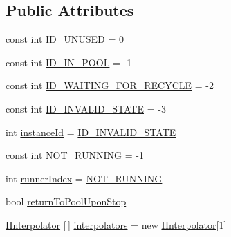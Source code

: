 \subsection*{Public Attributes}
\begin{DoxyCompactItemize}
\item 
const int \mbox{\hyperlink{class_leap_1_1_unity_1_1_animation_1_1_internal_1_1_tween_instance_adebc9c9f12e5bed3a16929995e0fe948}{I\+D\+\_\+\+U\+N\+U\+S\+ED}} = 0
\item 
const int \mbox{\hyperlink{class_leap_1_1_unity_1_1_animation_1_1_internal_1_1_tween_instance_a22e0c9acf38cb1d58b560f8de4d54bef}{I\+D\+\_\+\+I\+N\+\_\+\+P\+O\+OL}} = -\/1
\item 
const int \mbox{\hyperlink{class_leap_1_1_unity_1_1_animation_1_1_internal_1_1_tween_instance_afeb689214b275f07cf6300894566854c}{I\+D\+\_\+\+W\+A\+I\+T\+I\+N\+G\+\_\+\+F\+O\+R\+\_\+\+R\+E\+C\+Y\+C\+LE}} = -\/2
\item 
const int \mbox{\hyperlink{class_leap_1_1_unity_1_1_animation_1_1_internal_1_1_tween_instance_a473a4b74ec191d6e4dd245b67d824592}{I\+D\+\_\+\+I\+N\+V\+A\+L\+I\+D\+\_\+\+S\+T\+A\+TE}} = -\/3
\item 
int \mbox{\hyperlink{class_leap_1_1_unity_1_1_animation_1_1_internal_1_1_tween_instance_a4927d596827292267fcdd675a64ce1ce}{instance\+Id}} = \mbox{\hyperlink{class_leap_1_1_unity_1_1_animation_1_1_internal_1_1_tween_instance_a473a4b74ec191d6e4dd245b67d824592}{I\+D\+\_\+\+I\+N\+V\+A\+L\+I\+D\+\_\+\+S\+T\+A\+TE}}
\item 
const int \mbox{\hyperlink{class_leap_1_1_unity_1_1_animation_1_1_internal_1_1_tween_instance_adbf5b01cdf875afcb36d51ca1183a159}{N\+O\+T\+\_\+\+R\+U\+N\+N\+I\+NG}} = -\/1
\item 
int \mbox{\hyperlink{class_leap_1_1_unity_1_1_animation_1_1_internal_1_1_tween_instance_a5c88b5a5151ae7560a5a9be273381571}{runner\+Index}} = \mbox{\hyperlink{class_leap_1_1_unity_1_1_animation_1_1_internal_1_1_tween_instance_adbf5b01cdf875afcb36d51ca1183a159}{N\+O\+T\+\_\+\+R\+U\+N\+N\+I\+NG}}
\item 
bool \mbox{\hyperlink{class_leap_1_1_unity_1_1_animation_1_1_internal_1_1_tween_instance_a6d5a5e82be71da9ce8ac0ba219eeb186}{return\+To\+Pool\+Upon\+Stop}}
\item 
\mbox{\hyperlink{interface_leap_1_1_unity_1_1_animation_1_1_i_interpolator}{I\+Interpolator}} \mbox{[}$\,$\mbox{]} \mbox{\hyperlink{class_leap_1_1_unity_1_1_animation_1_1_internal_1_1_tween_instance_ab3c2cc2a7abb8442e78427766c150302}{interpolators}} = new \mbox{\hyperlink{interface_leap_1_1_unity_1_1_animation_1_1_i_interpolator}{I\+Interpolator}}\mbox{[}1\mbox{]}

\end{DoxyCompactItemize}
